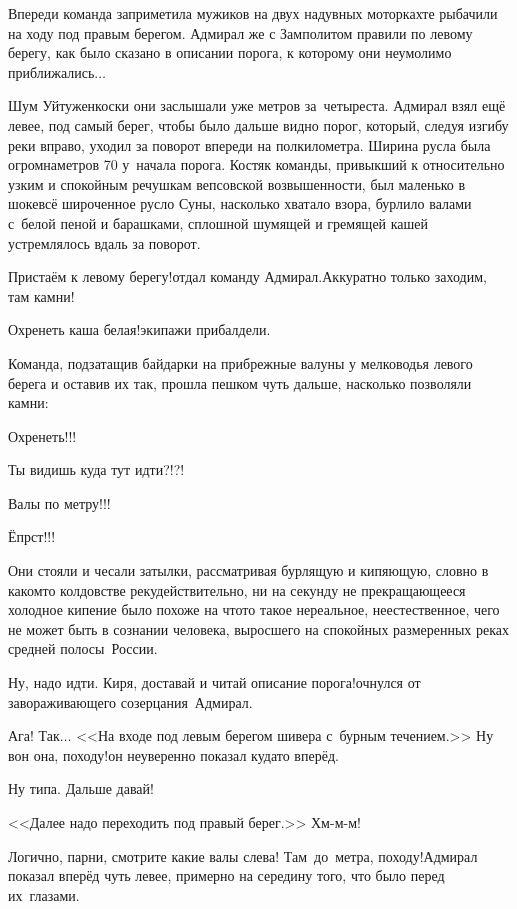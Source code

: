 Впереди команда заприметила мужиков на двух надувных моторках\mdash те рыбачили на ходу под правым берегом. Адмирал же с Замполитом правили по левому берегу, как было сказано в описании порога, к которому они неумолимо приближались$\dots$ 

Шум Уйтуженкоски они заслышали уже метров за~четыреста. Адмирал взял ещё левее, под самый берег, чтобы было дальше видно порог, который, следуя изгибу реки вправо, уходил за поворот впереди на полкилометра. Ширина русла была огромна\mdash метров 70 у~начала порога. Костяк команды, привыкший к относительно узким и спокойным речушкам вепсовской возвышенности, был маленько в шоке\mdash всё широченное русло Суны, насколько хватало взора, бурлило валами с~белой пеной и барашками, сплошной шумящей и гремящей кашей устремлялось вдаль за поворот.

\diagdash Пристаём к левому берегу!\mdash отдал команду Адмирал.\mdash Аккуратно только заходим, там камни!

\diagdash Охренеть каша белая!\mdash экипажи прибалдели.

Команда, подзатащив байдарки на прибрежные валуны у мелководья левого берега и оставив их так, прошла пешком чуть дальше, насколько позволяли камни:

\diagdash Охренеть!!!

\diagdash Ты видишь куда тут идти?!?!

\diagdash Валы по метру!!!

\diagdash Ёпрст!!!

Они стояли и чесали затылки, рассматривая бурлящую и кипяющую, словно в каком\sdash то колдовстве реку\mdash действительно, ни на секунду не прекращающееся холодное кипение было похоже на что\sdash то такое нереальное, неестественное, чего не может быть в сознании человека, выросшего на спокойных размеренных реках средней полосы~России.

\diagdash Ну, надо идти. Киря, доставай и читай описание порога!\mdash очнулся от завораживающего созерцания~Адмирал.

\diagdash Ага! Так$\ldots$ <<На входе под левым берегом шивера с~бурным течением.>> Ну вон она, походу!\mdash он неуверенно показал куда\sdash то вперёд.

\diagdash Ну типа. Дальше давай!

\diagdash <<Далее надо переходить под правый берег.>> Хм-м-м!

\diagdash Логично, парни, смотрите какие валы слева! Там~до~метра, походу!\mdash Адмирал показал вперёд чуть левее, примерно на середину того, что было перед их~глазами.

